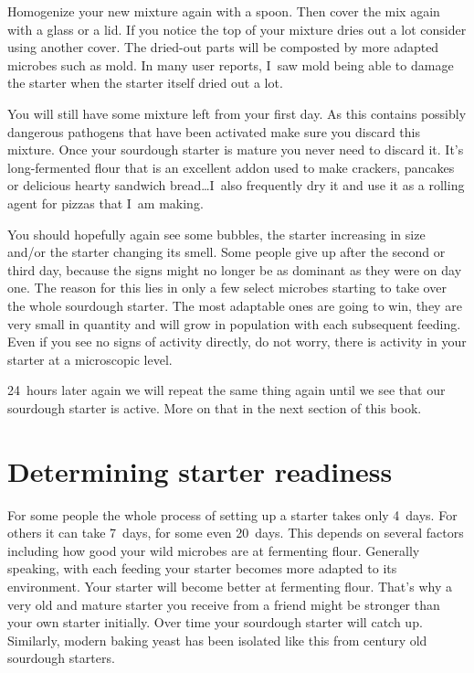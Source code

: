 Homogenize your new mixture again with a spoon. Then cover
the mix again with a glass or a lid. If you notice the top of
your mixture dries out a lot consider using another cover. The
dried-out parts will be composted by more adapted microbes such as
mold. In many user reports, I~saw mold being able to damage
the starter when the starter itself dried out a lot. 

You will
still have some mixture left from your first day. As this contains
possibly dangerous pathogens that have been activated make sure you discard
this mixture. Once your sourdough starter is mature you never need to
discard it. It's long-fermented flour that is an excellent addon
used to make crackers, pancakes or delicious hearty sandwich
bread\ldots I~also frequently dry it and use it as a rolling agent
for pizzas that I~am making.

You should hopefully again see some bubbles, the starter increasing
in size and/or the starter changing its smell. Some people give
up after the second or third day, because the signs might no longer
be as dominant as they were on day one. The reason for this lies in only a few
select microbes starting to take over the whole sourdough starter. The most
adaptable ones are going to win, they are very small in quantity and will
grow in population with each subsequent feeding. Even if you see no signs
of activity directly, do not worry, there is activity in
your starter at a microscopic level.

24~hours later again we will repeat the same thing again until
we see that our sourdough starter is active. More on that in the
next section of this book.

\section{Determining starter readiness}

For some people the whole process of setting up a starter takes
only 4~days. For others it can take 7~days, for some even 20~days.
This depends on several factors including how good your wild microbes
are at fermenting flour. Generally speaking, with each feeding
your starter becomes more adapted to its environment. Your
starter will become better at fermenting flour. That's why
a very old and mature starter you receive from a friend might
be stronger than your own starter initially. Over time
your sourdough starter will catch up. Similarly, modern baking
yeast has been isolated like this from century old sourdough
starters.

